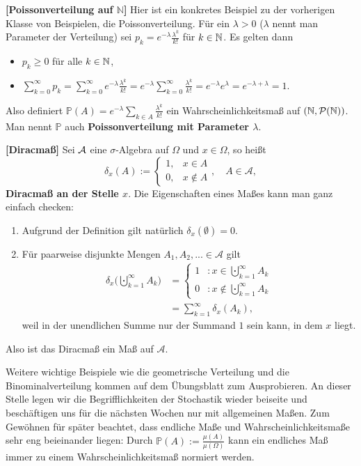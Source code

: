\begin{beispiel}\label{Poi1}  \textbf{[Poissonverteilung auf $\mathbb N$]}
	Hier ist ein konkretes Beispiel zu der vorherigen Klasse von Beispielen, die Poissonverteilung. F\"ur ein $\lambda >0$ ($\lambda$ nennt man Parameter der Verteilung) sei
	$p_k = e^{-\lambda} \frac{\lambda^k}{k!}$ f\"ur $k\in\mathbb{N}$. Es gelten dann
	\begin{itemize}
		\item $p_k \geq 0$ f\"ur alle $k\in\mathbb{N}$,
		\item $\sum\limits_{k=0}^{\infty} p_k = \sum\limits_{k=0}^{\infty} e^{-\lambda} \frac{\lambda^k}{k!} = e^{-\lambda} \sum\limits_{k=0}^{\infty} \frac{\lambda^k}{k!} = e^{-\lambda} e^{\lambda} = e^{-\lambda + \lambda} = 1$.
	\end{itemize}
	Also definiert $\mathbb P(A)=e^{-\lambda} \sum_{k\in A} \frac{\lambda^k}{k!}$ ein Wahrscheinlichkeitsma\ss{} auf $(\mathbb{N}, \mathcal P(\mathbb{N}))$. Man nennt $\mathbb P$ auch \textbf{Poissonverteilung mit Parameter $\lambda$}.
\end{beispiel}
\begin{beispiel}  \textbf{[Diracmaß]}
	Sei $\mathcal{A}$ eine $\sigma$-Algebra auf $\Omega$ und $x \in \Omega$, so heißt $$\delta_x(A):=\begin{cases}
	1,&x \in A\\
	0,&x \notin A
	\end{cases},\quad A\in \mathcal A,$$ \textbf{Diracmaß an der Stelle $x$}. Die Eigenschaften eines Ma\ss es kann man ganz einfach checken:
	\begin{enumerate}[label=(\roman*)]
		\item Aufgrund der Definition gilt nat\"urlich $\delta_x(\emptyset) = 0$.
		\item F\"ur paarweise disjunkte Mengen $A_1 ,A_2, ... \in \mathcal A$ gilt 
		\begin{align*}
		\delta_x\Big(\bigcupdot\limits_{k=1}^{\infty} A_k\Big) &= \begin{cases}
		1&:x \in \bigcupdot\limits_{k=1}^{\infty} A_k\\
		0&:x \notin \bigcupdot\limits_{k=1}^{\infty} A_k
		\end{cases}\\& = \sum\limits_{k=1}^{\infty} \delta_x(A_k),
		\end{align*}
		 weil in der unendlichen Summe nur der Summand $1$ sein kann, in dem $x$ liegt.
	\end{enumerate}
	Also ist das Diracma\ss{} ein Ma\ss{} auf $\mathcal A$.
\end{beispiel}
Weitere wichtige Beispiele wie die geometrische Verteilung und die Binominalverteilung kommen auf dem \"Ubungsblatt zum Ausprobieren. An dieser Stelle legen wir die Begrifflichkeiten der Stochastik wieder beiseite und besch\"aftigen uns f\"ur die n\"achsten Wochen nur mit allgemeinen Ma\ss en. Zum Gew\"ohnen f\"ur sp\"ater beachtet, dass endliche Ma\ss e und Wahrscheinlichkeitsma\ss e sehr eng beieinander liegen: Durch $\mathbb P(A):=\frac{\mu(A)}{\mu(\Omega)}$ kann ein endliches Ma\ss{} immer zu einem Wahrscheinlichkeitsma\ss{} \glqq normiert\grqq{} werden.\smallskip

